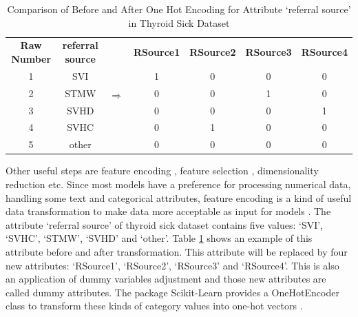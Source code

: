 \begin{table}[h]
    \centering
    \begin{tabular}{|c|c|c|c|c|c|c|}
    \cline{1-2} \cline{4-7}
    \textbf{Raw Number} & \textbf{referral source} & \multirow{6}{*}{$\Longrightarrow$} & \textbf{RSource1} & \textbf{RSource2} & \textbf{RSource3} & \textbf{RSource4} \\ \cline{1-2} \cline{4-7} 
    1                   & SVI                      &                        & 1                 & 0                 & 0                 & 0                 \\ \cline{1-2} \cline{4-7} 
    2                   & STMW                     &                        & 0                 & 0                 & 1                 & 0                 \\ \cline{1-2} \cline{4-7} 
    3                   & SVHD                     &                        & 0                 & 0                 & 0                 & 1                 \\ \cline{1-2} \cline{4-7} 
    4                   & SVHC                     &                        & 0                 & 1                 & 0                 & 0                 \\ \cline{1-2} \cline{4-7} 
    5                   & other                    &                        & 0                 & 0                 & 0                 & 0                 \\ \cline{1-2} \cline{4-7} 
    \end{tabular}
    \caption{Comparison of Before and After One Hot Encoding for Attribute `referral source' in Thyroid Sick Dataset}
    \label{tab7}
\end{table}

Other useful steps are feature encoding \cite{85}, feature selection \cite{87}, dimensionality reduction \cite{85} etc. Since most models have a preference for processing numerical data, handling some text and categorical attributes, feature encoding is a kind of useful data transformation to make data more acceptable as input for models \cite{85}. The attribute `referral source' of thyroid sick dataset contains five values: `SVI', `SVHC', `STMW', `SVHD' and `other'. Table \ref{tab7} shows an example of this attribute before and after transformation. This attribute will be replaced by four new attributes: `RSource1', `RSource2', `RSource3' and `RSource4'. This is also an application of dummy variables adjustment and those new attributes are called dummy attributes. The package Scikit-Learn provides a OneHotEncoder class to transform these kinds of category values into one-hot vectors \cite{85}.

